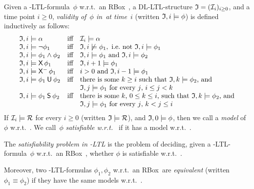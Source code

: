 \begin{definition}\label{def:semantics-shoq-ltl}
    Given a \SHOQ-LTL-formula~$\phi$ w.r.t.\ an RBox~\Rmc, a
    DL-LTL-structure $\mathfrak{I}=(\mathcal{I}_i)_{i\ge 0}$, and a time point $i\ge 0$,
    \emph{validity of~$\phi$ in~\Imf at time~$i$} (written $\mathfrak{I},i\models\phi$)
    is defined inductively as follows:
    \[\begin{array}{lcl}
        \Imf,i\models\alpha
            &\text{iff}
            &\Imc_i\models\alpha\\
        \Imf,i\models\lnot\phi_1
            &\text{iff}
            &\Imf,i\not\models\phi_1,\ \text{i.e.~not}\ \Imf,i\models\phi_1\\
        \Imf,i\models\phi_1\land\phi_2
            &\text{iff}
            &\Imf,i\models\phi_1\ \text{and}\ \Imf,i\models\phi_2\\
        \Imf,i\models\Next\phi_1
            &\text{iff}
            &\Imf,i+1\models\phi_1\\
        \Imf,i\models\Previous\phi_1
            &\text{iff}
            &i>0\ \text{and}\ \Imf,i-1\models\phi_1\\
        \Imf,i\models\phi_1\Until\phi_2
            &\text{iff}
            &\text{there is some $k\geq i$ such that $\Imf,k\models\phi_2$, and}\\
            & &\text{$\Imf,j\models\phi_1$ for every $j$, $i\le j<k$}\\
        \Imf,i\models\phi_1\Since\phi_2
            &\text{iff}
            &\text{there is some $k$, $0\le k\le i$, such that $\Imf,k\models\phi_2$, and}\\
            & &\text{$\Imf,j\models\phi_1$ for every $j$, $k<j\le i$}
    \end{array}\]
    If $\mathcal{I}_i\models\mathcal{R}$ for every $i\ge 0$ (written $\mathfrak{I}\models\mathcal{R}$), and
    $\mathfrak{I},0\models\phi$, then we call \Imf a \emph{model} of~$\phi$ w.r.t.~\Rmc.
    We call~$\phi$ \emph{satisfiable w.r.t.~\Rmc} if it has a model w.r.t.~\Rmc.

    The \emph{satisfiability problem in \SHOQ-LTL} is the problem of deciding,
    given a \SHOQ-LTL-formula~$\phi$ w.r.t.\ an RBox~\Rmc, whether $\phi$ is
    satisfiable w.r.t.~\Rmc.

    Moreover, two \SHOQ-LTL-formulas $\phi_1,\phi_2$ w.r.t.\ an RBox~\Rmc are
    \emph{equivalent} (written $\phi_1\equiv\phi_2$) if they have the same
    models w.r.t.~\Rmc.
\end{definition}

